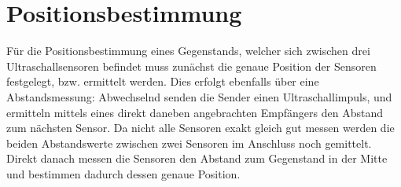 \section{Positionsbestimmung}
Für die Positionsbestimmung eines Gegenstands, welcher sich zwischen drei Ultraschallsensoren befindet muss zunächst die genaue Position der Sensoren festgelegt, bzw. ermittelt werden. Dies erfolgt ebenfalls über eine Abstandsmessung: 
Abwechselnd senden die Sender einen Ultraschallimpuls, und ermitteln mittels eines direkt daneben angebrachten Empfängers den Abstand zum nächsten Sensor. Da nicht alle Sensoren exakt gleich gut messen werden die beiden Abstandswerte zwischen zwei Sensoren im Anschluss noch gemittelt. Direkt danach messen die Sensoren den Abstand zum Gegenstand in der Mitte und bestimmen dadurch dessen genaue Position.


